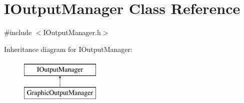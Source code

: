 \hypertarget{class_i_output_manager}{}\section{I\+Output\+Manager Class Reference}
\label{class_i_output_manager}


{\ttfamily \#include $<$I\+Output\+Manager.\+h$>$}

Inheritance diagram for I\+Output\+Manager\+:\begin{figure}[H]
\begin{center}
\leavevmode
\includegraphics[height=2.000000cm]{class_i_output_manager}
\end{center}
\end{figure}
